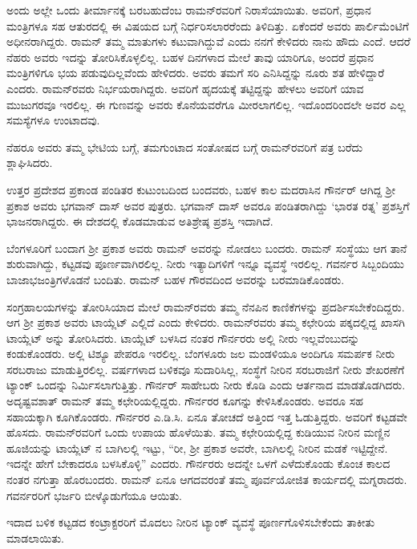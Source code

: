 ಅಂದು ಅಲ್ಲೇ ಒಂದು ತೀರ್ಮಾನಕ್ಕೆ ಬರಬಹುದೆಂಬ ರಾಮನ್‍ರವರಿಗೆ ನಿರಾಸೆಯಾಯಿತು. ಅವರಿಗೆ, ಪ್ರಧಾನ ಮಂತ್ರಿಗಳೂ ಸಹ ಆತುರದಲ್ಲಿ ಈ ವಿಷಯದ ಬಗ್ಗೆ ನಿರ್ಧರಿಸಲಾರರೆಂದು ತಿಳಿದಿತ್ತು. ಏಕೆಂದರೆ ಅವರು ಪಾರ್ಲಿಮೆಂಟಿಗೆ ಅಧೀನರಾಗಿದ್ದರು. ರಾಮನ್ ತಮ್ಮ ಮಾತುಗಳು ಕಟುವಾಗಿದ್ದುವೆ ಎಂದು ನನಗೆ ಕೇಳಿದರು ನಾನು ಹೌದು ಎಂದೆ. ಆದರೆ ನೆಹರು ಅವರು ಇದನ್ನು ತೋರಿಸಿಕೊಳ್ಳಲಿಲ್ಲ. ಬಹಳ ದಿನಗಳಾದ ಮೇಲೆ ತಾವು ಯಾರಿಗೂ, ಅಂದರೆ ಪ್ರಧಾನ ಮಂತ್ರಿಗಳಿಗೂ ಭಯ ಪಡುವುದಿಲ್ಲವೆಂದು ಹೇಳಿದರು. ಅವರು ತಮಗೆ ಸರಿ ಎನಿಸಿದ್ದನ್ನು ನೂರು ಶತ ಹೇಳಿದ್ದಾರೆ ಎಂದರು. ರಾಮನ್‍ರವರು ನಿರ್ಭಯರಾಗಿದ್ದರು. ಅವರಿಗೆ ಹೃದಯಕ್ಕೆ ತಟ್ಟಿದ್ದನ್ನು ಹೇಳಲು ಅವರಿಗೆ ಯಾವ ಮುಜುಗರವೂ ಇರಲಿಲ್ಲ. ಈ ಗುಣವನ್ನು ಅವರು ಕೊನೆಯವರೆಗೂ ಮೀರಲಾಗಲಿಲ್ಲ. ಇದೊಂದರಿಂದಲೇ ಅವರ ಎಲ್ಲ ಸಮಸ್ಯೆಗಳೂ ಉಂಟಾದವು.

ನೆಹರೂ ಅವರು ತಮ್ಮ ಭೇಟಿಯ ಬಗ್ಗೆ, ತಮಗುಂಟಾದ ಸಂತೋಷದ ಬಗ್ಗೆ ರಾಮನ್‍ರವರಿಗೆ ಪತ್ರ ಬರೆದು ಶ್ಲಾಘಿಸಿದರು.



ಉತ್ತರ ಪ್ರದೇಶದ ಪ್ರಕಾಂಡ ಪಂಡಿತರ ಕುಟುಂಬದಿಂದ ಬಂದವರು, ಬಹಳ ಕಾಲ ಮದರಾಸಿನ ಗೌರ್ನರ್ ಆಗಿದ್ದ ಶ‍್ರೀ ಪ್ರಕಾಶ ಅವರು ಭಗವಾನ್ ದಾಸ್ ಅವರ ಪುತ್ರರು. ಭಗವಾನ್ ದಾಸ್ ಅವರೂ ಪಂಡಿತರಾಗಿದ್ದು ‘ಭಾರತ ರತ್ನ’ ಪ್ರಶಸ್ತಿಗೆ ಭಾಜನರಾಗಿದ್ದರು. ಈ ದೇಶದಲ್ಲಿ ಕೊಡಮಾಡುವ ಅತಿಶ್ರೇಷ್ಠ ಪ್ರಶಸ್ತಿ ಇದಾಗಿದೆ.

ಬೆಂಗಳೂರಿಗೆ ಬಂದಾಗ ಶ‍್ರೀ ಪ್ರಕಾಶ ಅವರು ರಾಮನ್ ಅವರನ್ನು ನೋಡಲು ಬಂದರು. ರಾಮನ್ ಸಂಸ್ಥೆಯು ಆಗ ತಾನೆ ಶುರುವಾಗಿದ್ದು, ಕಟ್ಟಡವು ಪೂರ್ಣವಾಗಿರಲಿಲ್ಲ. ನೀರು ಇತ್ಯಾದಿಗಳಿಗೆ ಇನ್ನೂ ವ್ಯವಸ್ಥೆ ಇರಲಿಲ್ಲ. ಗವರ್ನರ ಸಿಬ್ಬಂದಿಯು ಬಾಜಾಭಜಂತ್ರಿಗಳೊಡನೆ ಬಂದಿತು. ರಾಮನ್ ಬಹಳ ಗೌರವದಿಂದ ಅವರನ್ನು ಬರಮಾಡಿಕೊಂಡರು.

ಸಂಗ್ರಹಾಲಯಗಳನ್ನು ತೋರಿಸಿಯಾದ ಮೇಲೆ ರಾಮನ್‍ರವರು ತಮ್ಮ ನೆನಪಿನ ಕಾಣಿಕೆಗಳನ್ನು ಪ್ರದರ್ಶಿಸಬೇಕೆಂದಿದ್ದರು. ಆಗ ಶ‍್ರೀ ಪ್ರಕಾಶ ಅವರು ಟಾಯ್ಲೆಟ್ ಎಲ್ಲಿದೆ ಎಂದು ಕೇಳಿದರು. ರಾಮನ್‍ರವರು ತಮ್ಮ ಕಛೇರಿಯ ಪಕ್ಕದಲ್ಲಿದ್ದ ಖಾಸಗಿ ಟಾಯ್ಲೆಟ್ ಅನ್ನು ತೋರಿಸಿದರು. ಟಾಯ್ಲೆಟ್ ಬಳಸಿದ ನಂತರ ಗೌರ್ನರರು ಅಲ್ಲಿ ನೀರು ಇಲ್ಲವೆಂಬುದನ್ನು ಕಂಡುಕೊಂಡರು. ಅಲ್ಲಿ ಟಿಶ್ಯೂ ಪೇಪರೂ ಇರಲಿಲ್ಲ. ಬೆಂಗಳೂರು ಜಲ ಮಂಡಳಿಯೂ ಅಂದಿಗೂ ಸಮರ್ಪಕ ನೀರು ಸರಬರಾಜು ಮಾಡುತ್ತಿರಲಿಲ್ಲ.  ವರ್ಷಗಳಾದ ಬಳಿಕವೂ ಸುದಾರಿಸಿಲ್ಲ, ಸಂಸ್ಥೆಗೆ ನೀರಿನ ಸರಬರಾಜಿಗೆ ನೀರು ಶೇಖರಣೆಗೆ ಟ್ಯಾಂಕ್ ಒಂದನ್ನು ನಿರ್ಮಿಸಲಾಗುತ್ತಿತ್ತು. ಗೌರ್ನರ್ ಸಾಹೇಬರು ನೀರು ಕೊಡಿ ಎಂದು ಆರ್ತನಾದ ಮಾಡತೊಡಗಿದರು. ಅದೃಷ್ಟವಶಾತ್ ರಾಮನ್ ತಮ್ಮ ಕಛೇರಿಯಲ್ಲಿದ್ದರು. ಗೌರ್ನರರ ಕೂಗನ್ನು ಕೇಳಿಸಿಕೊಂಡರು. ಅವರೂ ಸಹ ಸಹಾಯಕ್ಕಾಗಿ ಕೂಗಿಕೊಂಡರು. ಗೌರ್ನರರ ಎ.ಡಿ.ಸಿ. ಏನೂ ತೋಚದೆ ಅತ್ತಿಂದ ಇತ್ತ ಓಡುತ್ತಿದ್ದರು. ಅವರಿಗೆ ಕಟ್ಟಡವೇ ಹೊಸದು. ರಾಮನ್‍ರವರಿಗೆ ಒಂದು ಉಪಾಯ ಹೊಳೆಯಿತು. ತಮ್ಮ ಕಛೇರಿಯಲ್ಲಿದ್ದ ಕುಡಿಯುವ ನೀರಿನ ಮಣ್ಣಿನ ಹೂಜಿಯನ್ನು ಟಾಯ್ಲೆಟ್ ನ ಬಾಗಿಲಲ್ಲಿ ಇಟ್ಟು, “ರೀ, ಶ‍್ರೀ ಪ್ರಕಾಶ ಅವರೇ, ಬಾಗಿಲಲ್ಲಿ ನೀರಿನ ಮಡಕೆ ಇಟ್ಟಿದ್ದೇನೆ. ಇದನ್ನೇ ಹೇಗೆ ಬೇಕಾದರೂ ಬಳಸಿಕೊಳ್ಳಿ” ಎಂದರು. ಗೌರ್ನರರು ಅದನ್ನೇ ಒಳಗೆ ಎಳೆದುಕೊಂಡು ಕೊಂಚ ಕಾಲದ ನಂತರ ನಗುತ್ತಾ ಹೊರಬಂದರು. ರಾಮನ್ ಏನೂ ಆಗದವರಂತೆ ತಮ್ಮ ಪೂರ್ವಯೋಜಿತ ಕಾರ್ಯದಲ್ಲಿ ಮಗ್ನರಾದರು. ಗವರ್ನರರಿಗೆ ಭರ್ಜರಿ ಬೀಳ್ಕೊಡುಗೆಯೂ ಆಯಿತು.

ಇದಾದ ಬಳಿಕ ಕಟ್ಟಡದ ಕಂಟ್ರಾಕ್ಟರರಿಗೆ ಮೊದಲು ನೀರಿನ ಟ್ಯಾಂಕ್ ವ್ಯವಸ್ಥೆ ಪೂರ್ಣಗೊಳಿಸ\-ಬೇಕೆಂದು ತಾಕೀತು ಮಾಡಲಾಯಿತು.


